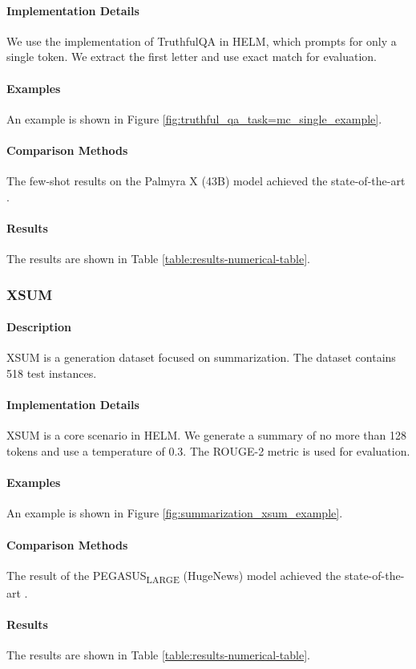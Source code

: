 \paragraph{Implementation Details}
We use the implementation of TruthfulQA in HELM, which prompts for only a single token. We extract the first letter and use exact match for evaluation.

\paragraph{Examples} An example is shown in Figure \ref{fig:truthful_qa_task=mc_single_example}.

\paragraph{Comparison Methods}
The few-shot results on the Palmyra X (43B) model achieved the state-of-the-art \citep{liang2022holistic}.

\paragraph{Results} The results are shown in Table \ref{table:results-numerical-table}.

\subsubsection{XSUM} 
\paragraph{Description} XSUM \citep{narayan2018dont} is a generation dataset focused on summarization. The dataset contains 518 test instances.

\paragraph{Implementation Details}
XSUM is a core scenario in HELM. We generate a summary of no more than 128 tokens and use a temperature of 0.3. The ROUGE-2 metric is used for evaluation.

\paragraph{Examples} An example is shown in Figure \ref{fig:summarization_xsum_example}.

\paragraph{Comparison Methods}
The result of the PEGASUS\textsubscript{LARGE} (HugeNews) model achieved the state-of-the-art \citep{zhang2020pegasus}.

\paragraph{Results} The results are shown in Table \ref{table:results-numerical-table}.